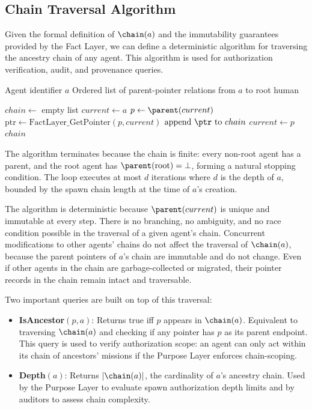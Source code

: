 \subsection{Chain Traversal Algorithm}

Given the formal definition of $\chain(a)$ and the immutability guarantees provided by the Fact Layer, we can define a deterministic algorithm for traversing the ancestry chain of any agent. This algorithm is used for authorization verification, audit, and provenance queries.

\begin{algorithm}
\caption{ChainTraversal$(a)$}
\label{alg:chain_traversal}
\begin{algorithmic}
\REQUIRE Agent identifier $a$
\ENSURE Ordered list of parent-pointer relations from $a$ to root human

\STATE $chain \leftarrow$ empty list
\STATE $current \leftarrow a$
    \STATE $p \leftarrow \parent(current)$
    \STATE $\text{ptr} \leftarrow \text{FactLayer\_GetPointer}(p, current)$
    \STATE $\text{append } \ptr \text{ to } chain$
    \STATE $current \leftarrow p$
\ENDWHILE
\RETURN $chain$
\end{algorithmic}
\end{algorithm}

The algorithm terminates because the chain is finite: every non-root agent has a parent, and the root agent has $\parent(\text{root}) = \bot$, forming a natural stopping condition. The loop executes at most $d$ iterations where $d$ is the depth of $a$, bounded by the spawn chain length at the time of $a$'s creation.

The algorithm is deterministic because $\parent(current)$ is unique and immutable at every step. There is no branching, no ambiguity, and no race condition possible in the traversal of a given agent's chain. Concurrent modifications to other agents' chains do not affect the traversal of $\chain(a)$, because the parent pointers of $a$'s chain are immutable and do not change. Even if other agents in the chain are garbage-collected or migrated, their pointer records in the chain remain intact and traversable.

Two important queries are built on top of this traversal:

\begin{itemize}
\item \textbf{IsAncestor}$(p, a)$: Returns $\text{true}$ iff $p$ appears in $\chain(a)$. Equivalent to traversing $\chain(a)$ and checking if any pointer has $p$ as its parent endpoint. This query is used to verify authorization scope: an agent can only act within its chain of ancestors' missions if the Purpose Layer enforces chain-scoping.
\item \textbf{Depth}$(a)$: Returns $|\chain(a)|$, the cardinality of $a$'s ancestry chain. Used by the Purpose Layer to evaluate spawn authorization depth limits and by auditors to assess chain complexity.
\end{itemize}

